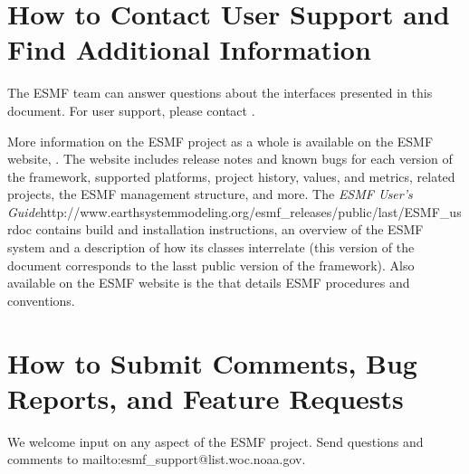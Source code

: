 \section{How to Contact User Support and Find Additional Information}
\label{sec:Support}
The ESMF team can answer questions about the interfaces presented in this 
document.  For user support, please contact 
.  

More information on the ESMF project as a whole is available on the 
ESMF website, .  
The website includes release notes and known bugs for each version of the
framework, supported platforms, project history, values, and metrics, related projects,
the ESMF management structure, and more.  The \htmladdnormallink
{{\it ESMF User's Guide}}{http://www.earthsystemmodeling.org/esmf_releases/public/last/ESMF_usrdoc} contains build and installation instructions, an overview of the ESMF system and a description of 
how its classes interrelate (this version of the document corresponds to the lasst public version of the framework).  Also available on the ESMF website is the 
that details ESMF procedures and conventions.  
 
\section{How to Submit Comments, Bug Reports, and Feature Requests}
\label{sec:Submission}
We welcome input on any aspect of the ESMF project.  Send
questions and comments to 
{mailto:esmf\_support@list.woc.noaa.gov}.






